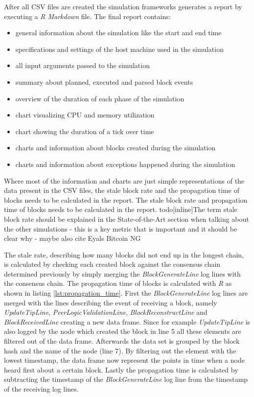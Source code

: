After all CSV files are created the simulation frameworks generates a report by executing a \textit{R Markdown} file.
The final report contains:
\begin{itemize}
	\item general information about the simulation like the start and end time
	\item specifications and settings of the host machine used in the simulation
	\item all input arguments passed to the simulation
	\item summary about planned, executed and parsed block events
	\item overview of the duration of each phase of the simulation
	\item chart visualizing CPU and memory utilization
	\item chart showing the duration of a tick over time
	\item charts and information about blocks created during the simulation
	\item charts and information about exceptions happened during the simulation
\end{itemize}

Where most of the information and charts are just simple representations of the data present in the CSV files, the stale block rate and the propagation time of blocks needs to be calculated in the report.
	The stale block rate and propagation time of blocks needs to be calculated in the report.
todo[inline]{The term stale block rate should be explained in the State-of-the-Art section when talking about the other simulations - this is a key metric that is important and it should be clear why - maybe also cite Eyals Bitcoin NG}

The stale rate, describing how many blocks did not end up in the longest chain, is calculated by checking each created block against the consensus chain determined previously by simply merging the \textit{BlockGenerateLine} log lines with the consensus chain.
The propagation time of blocks is calculated with \textit{R} as shown in listing \ref{lst:propagation_time}.
First the \textit{BlockGenerateLine} log lines are merged with the lines describing the event of receiving a block, namely	\textit{UpdateTipLine}, \textit{PeerLogicValidationLine}, \textit{BlockReconstructLine} and \textit{BlockReceivedLine} creating a new data frame.
Since for example \textit{UpdateTipLine} is also logged by the node which created the block in line 5 all these elements are filtered out of the data frame.
Afterwards the data set is grouped by the block hash and the name of the node (line 7).
By filtering out the element with the lowest timestamp, the data frame now represent the points in time when a node heard first about a certain block.
Lastly the propagation time is calculated by subtracting the timestamp of the \textit{BlockGenerateLine} log line from the timestamp of the receiving log lines.

